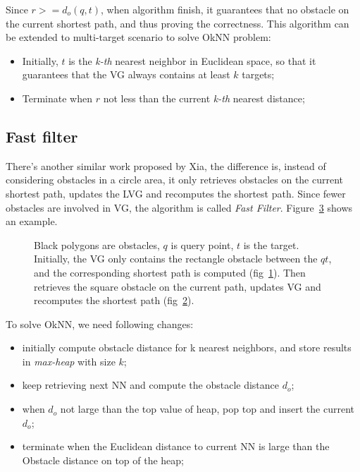 Since $r>=d_o(q, t)$, when algorithm finish, it guarantees that no obstacle on the current shortest
path, and thus proving the correctness. This algorithm can be extended to multi-target
scenario to solve OkNN problem:
\begin{itemize}
  \item Initially, $t$ is the \textit{k-th} nearest neighbor in Euclidean space, so that it
    guarantees that the VG always contains at least $k$ targets;
  \item Terminate when $r$  not less than the current \textit{k-th} nearest distance;
\end{itemize}

\subsection{Fast filter}

There's another similar work proposed by Xia\cite{xia2004fast},
the difference is, instead of considering obstacles in a circle area,
it only retrieves obstacles on the current shortest path,
updates the LVG and recomputes the shortest path.
Since fewer obstacles are involved in VG,
the algorithm is called \textit{Fast Filter}.
Figure~\ref{xia} shows an example.
\begin{figure}[!h]
  \centering
  \begin{subfigure}{.45\linewidth}
    \centering
    
    \caption{}
    \label{xia0}
  \end{subfigure}%
  \begin{subfigure}{.45\linewidth}
    \centering
    
    \caption{}
    \label{xia1}
  \end{subfigure}
  \caption{
    \small Black polygons are obstacles,
    $q$ is query point, $t$ is the target.
    Initially, the VG only contains
    the rectangle obstacle between the $qt$,
    and the corresponding shortest path is computed (fig~\ref{xia0}).
    Then retrieves the square
    obstacle on the current path,
    updates VG and recomputes the shortest path (fig~\ref{xia1}).
  }
  \label{xia}
\end{figure}

To solve OkNN, we need following changes:
\begin{itemize}
  \item initially compute obstacle distance for k nearest neighbors, and store results in
    \textit{max-heap} with size $k$;
  \item keep retrieving next NN and compute the obstacle distance $d_o$;
  \item when $d_o$ not large than the top value of heap, pop top and insert the current $d_o$;
  \item terminate when the Euclidean distance to current NN is large than the Obstacle distance
    on top of the heap;
\end{itemize}
